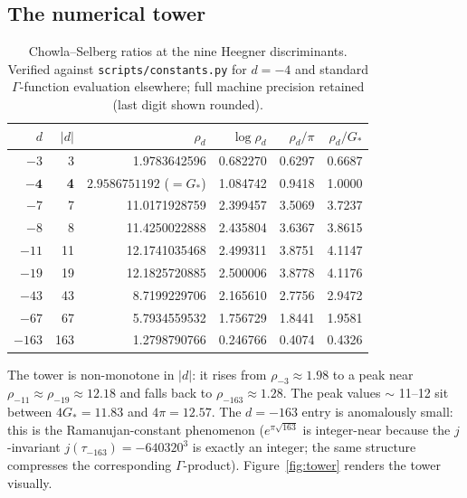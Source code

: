 \documentclass[11pt,reqno]{amsart}
\theoremstyle{plain}
\theoremstyle{definition}
\theoremstyle{remark}
\numberwithin{equation}{section}
\newcommand{\Gstar}{G_{\!*}}
\begin{document}
\subsection{The numerical tower}

\begin{table}[h]
\centering
\begin{tabular}{r r r r r r}
\toprule
$d$ & $|d|$ & $\rho_{d}$ & $\log \rho_{d}$ & $\rho_{d}/\pi$ & $\rho_{d}/\Gstar$ \\
\midrule
$-3$    & 3   & 1.9783642596 & 0.682270 & 0.6297 & 0.6687 \\
$\mathbf{-4}$    & \textbf{4}   & $\mathbf{2.9586751192}$ ($=\Gstar$) & 1.084742 & 0.9418 & 1.0000 \\
$-7$    & 7   & 11.0171928759 & 2.399457 & 3.5069 & 3.7237 \\
$-8$    & 8   & 11.4250022888 & 2.435804 & 3.6367 & 3.8615 \\
$-11$   & 11  & 12.1741035468 & 2.499311 & 3.8751 & 4.1147 \\
$-19$   & 19  & 12.1825720885 & 2.500006 & 3.8778 & 4.1176 \\
$-43$   & 43  & 8.7199229706  & 2.165610 & 2.7756 & 2.9472 \\
$-67$   & 67  & 5.7934559532  & 1.756729 & 1.8441 & 1.9581 \\
$-163$  & 163 & 1.2798790766  & 0.246766 & 0.4074 & 0.4326 \\
\bottomrule
\end{tabular}
\caption{Chowla--Selberg ratios at the nine Heegner discriminants.
Verified against \texttt{scripts/constants.py} for $d=-4$ and
standard $\Gamma$-function evaluation elsewhere; full machine
precision retained (last digit shown rounded).}
\label{tab:tower}
\end{table}

The tower is non-monotone in $|d|$: it rises from $\rho_{-3} \approx
1.98$ to a peak near $\rho_{-11} \approx \rho_{-19} \approx 12.18$
and falls back to $\rho_{-163} \approx 1.28$. The peak values $\sim$
11--12 sit between $4\Gstar = 11.83$ and $4\pi = 12.57$. The $d=-163$
entry is anomalously small: this is the Ramanujan-constant phenomenon
($e^{\pi\sqrt{163}}$ is integer-near because the $j$-invariant
$j(\tau_{-163}) = -640320^{3}$ is exactly an integer; the same
structure compresses the corresponding $\Gamma$-product).
Figure~\ref{fig:tower} renders the tower visually.
\end{document}
